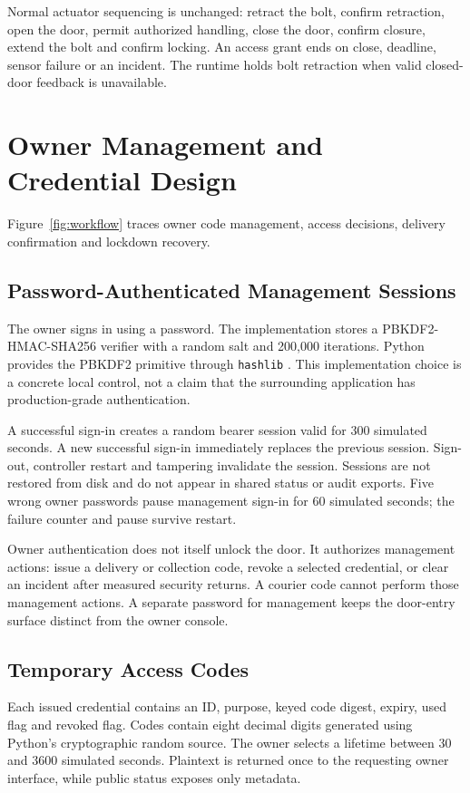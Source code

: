 \documentclass[conference,letterpaper]{IEEEtran}
\newcommand{\code}[1]{\texttt{\small #1}}
\begin{document}
Normal actuator sequencing is unchanged: retract the bolt, confirm retraction, open the door, permit authorized handling, close the door, confirm closure, extend the bolt and confirm locking. An access grant ends on close, deadline, sensor failure or an incident. The runtime holds bolt retraction when valid closed-door feedback is unavailable.

\section{Owner Management and Credential Design}
Figure~\ref{fig:workflow} traces owner code management, access decisions, delivery confirmation and lockdown recovery.
\subsection{Password-Authenticated Management Sessions}
The owner signs in using a password. The implementation stores a PBKDF2-HMAC-SHA256 verifier with a random salt and 200,000 iterations. Python provides the PBKDF2 primitive through \code{hashlib} \cite{pythonhash}. This implementation choice is a concrete local control, not a claim that the surrounding application has production-grade authentication.

A successful sign-in creates a random bearer session valid for 300 simulated seconds. A new successful sign-in immediately replaces the previous session. Sign-out, controller restart and tampering invalidate the session. Sessions are not restored from disk and do not appear in shared status or audit exports. Five wrong owner passwords pause management sign-in for 60 simulated seconds; the failure counter and pause survive restart.

Owner authentication does not itself unlock the door. It authorizes management actions: issue a delivery or collection code, revoke a selected credential, or clear an incident after measured security returns. A courier code cannot perform those management actions. A separate password for management keeps the door-entry surface distinct from the owner console.

\subsection{Temporary Access Codes}
Each issued credential contains an ID, purpose, keyed code digest, expiry, used flag and revoked flag. Codes contain eight decimal digits generated using Python's cryptographic random source. The owner selects a lifetime between 30 and 3600 simulated seconds. Plaintext is returned once to the requesting owner interface, while public status exposes only metadata.
\end{document}

